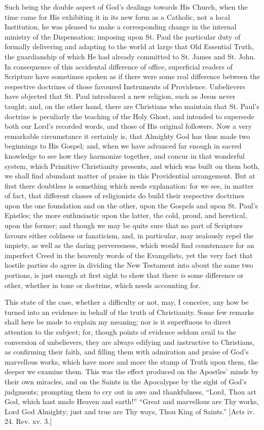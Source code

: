 Such being the double aspect of God's dealings towards His Church,
when the time came for His exhibiting it in its new form as a Catholic,
not a local Institution, he was pleased to make a corresponding change
in the internal ministry of the Dispensation; imposing upon St. Paul the
particular duty of formally delivering and adapting to the world at
large that Old Essential Truth, the guardianship of which He had already
committed to St. James and St. John. In consequence of this accidental
difference of office, superficial readers of Scripture have sometimes
spoken as if there were some real difference between the respective
doctrines of those favoured Instruments of Providence. Unbelievers have
objected that St. Paul introduced a new religion, such as Jesus never
taught; and, on the other hand, there are Christians who maintain that
St. Paul's doctrine is peculiarly the teaching of the Holy Ghost, and
intended to supersede both our Lord's recorded words, and those of His
original followers. Now a very remarkable circumstance it certainly is,
that Almighty God has thus made two beginnings to His Gospel; and, when
we have advanced far enough in sacred knowledge to see how they
harmonize together, and concur in that wonderful system, which Primitive
Christianity presents, and which was built on them both, we shall find
abundant matter of praise in this Providential arrangement. But at first
there doubtless is something which needs explanation: for we see, in
matter of fact, that different classes of religionists do build their
respective doctrines upon the one foundation and on the other, upon the
Gospels and upon St. Paul's Epistles; the more enthusiastic upon the
latter, the cold, proud, and heretical, upon the former; and though we
may be quite sure that no part of Scripture favours either coldness or
fanaticism, and, in particular, may zealously repel the impiety, as well
as the daring perverseness, which would find countenance for an
imperfect Creed in the heavenly words of the Evangelists, yet the very
fact that hostile parties do agree in dividing the New Testament into
about the same two portions, is just enough at first sight to show that
there \emph{is} some difference or other, whether in tone or doctrine, which
needs accounting for.

This state of the case, whether a difficulty or not, may, I conceive,
any how be turned into an evidence in behalf of the truth of
Christianity. Some few remarks shall here be made to explain my meaning;
nor is it superfluous to direct attention to the subject; for, though
points of evidence seldom avail to the conversion of unbelievers, they
are always edifying and instructive to Christians, as confirming their
faith, and filling them with admiration and praise of God's marvellous
works, which have more and more the stamp of Truth upon them, the deeper
we examine them. This was the effect produced on the Apostles' minds by
their own miracles, and on the Saints in the Apocalypse by the sight of
God's judgments; prompting them to cry out in awe and thankfulness,
``Lord, Thou art God, which hast made Heaven and earth!''
``Great and marvellous are Thy works, Lord God Almighty; just and
true are Thy ways, Thou King of Saints.'' [Acts iv. 24. Rev. xv. 3.]

